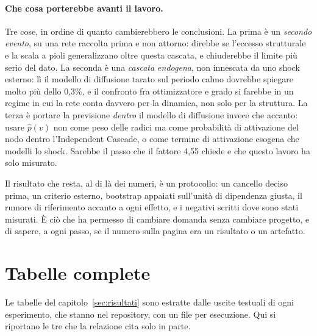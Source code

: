 \documentclass[11pt,a4paper]{article}
\newcommand{\phat}{\hat{p}}
\begin{document}
\paragraph{Che cosa porterebbe avanti il lavoro.} Tre cose, in ordine di quanto cambierebbero le conclusioni. La prima è un \emph{secondo evento}, su una rete raccolta prima e non attorno: direbbe se l'eccesso strutturale e la scala a pioli generalizzano oltre questa cascata, e chiuderebbe il limite più serio del dato. La seconda è una \emph{cascata endogena}, non innescata da uno shock esterno: lì il modello di diffusione tarato sul periodo calmo dovrebbe spiegare molto più dello 0,3\%, e il confronto fra ottimizzatore e grado si farebbe in un regime in cui la rete conta davvero per la dinamica, non solo per la struttura. La terza è portare la previsione \emph{dentro} il modello di diffusione invece che accanto: usare $\phat(v)$ non come peso delle radici ma come probabilità di attivazione del nodo dentro l'Independent Cascade, o come termine di attivazione esogena che modelli lo shock. Sarebbe il passo che il fattore 4,55 chiede e che questo lavoro ha solo misurato.

Il risultato che resta, al di là dei numeri, è un protocollo: un cancello deciso prima, un criterio esterno, bootstrap appaiati sull'unità di dipendenza giusta, il rumore di riferimento accanto a ogni effetto, e i negativi scritti dove sono stati misurati. È ciò che ha permesso di cambiare domanda senza cambiare progetto, e di sapere, a ogni passo, se il numero sulla pagina era un risultato o un artefatto.

\appendix
\clearpage
\section{Tabelle complete}
\label{app:tabelle}
Le tabelle del capitolo~\ref{sec:risultati} sono estratte dalle uscite testuali di ogni esperimento, che stanno nel repository, con un file per esecuzione. Qui si riportano le tre che la relazione cita solo in parte.
\end{document}
